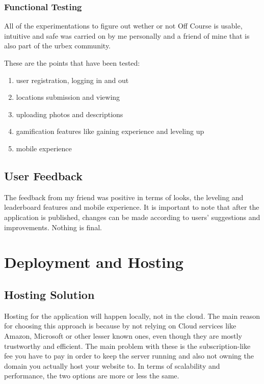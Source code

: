 \documentclass[12pt,a4paper]{report}
\begin{document}
\subsection{Functional Testing}

All of the experimentations to figure out wether or not Off Course is usable, intuitive and safe was carried on by me personally and a friend of mine that is also part of the urbex community.

These are the points that have been tested:

\begin{enumerate}
    \item user registration, logging in and out
    \item locations submission and viewing
    \item uploading photos and descriptions
    \item gamification features like gaining experience and leveling up
    \item mobile experience
\end{enumerate}

\section{User Feedback}

The feedback from my friend was positive in terms of looks, the leveling and leaderboard features and mobile experience. It is important to note that after the application is published, changes can be made according to users' suggestions and improvements. Nothing is final.

\chapter{Deployment and Hosting}
\section{Hosting Solution}

Hosting for the application will happen locally, not in the cloud. The main reason for choosing this approach is because by not relying on Cloud services like Amazon, Microsoft or other lesser known ones, even though they are mostly trustworthy and efficient. The main problem with these is the subscription-like fee you have to pay in order to keep the server running and also not owning the domain you actually host your website to. In terms of scalability and performance, the two options are more or less the same.
\end{document}
